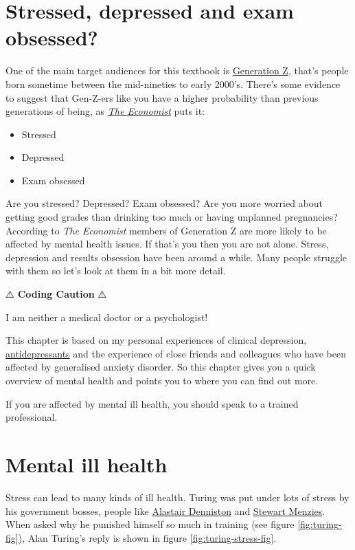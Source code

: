 \documentclass[
]{book}
\providecommand{\tightlist}{%
  \setlength{\itemsep}{0pt}\setlength{\parskip}{0pt}}
\begin{document}
\hypertarget{genz}{%
\section{Stressed, depressed and exam obsessed?}\label{genz}}

One of the main target audiences for this textbook is \href{https://en.wikipedia.org/wiki/Generation_Z}{Generation Z}, that's people born sometime between the mid-nineties to early 2000's. There's some evidence to suggest that Gen-Z-ers like you have a higher probability than previous generations of being, as \emph{\href{https://en.wikipedia.org/wiki/The_Economist}{The Economist}} puts it:

\begin{itemize}
\tightlist
\item
  Stressed
\item
  Depressed
\item
  Exam obsessed
\end{itemize}

Are you stressed? Depressed? Exam obsessed? Are you more worried about getting good grades than drinking too much or having unplanned pregnancies? According to \emph{The Economist} members of Generation Z are more likely to be affected by mental health issues. \citep{generationz} If that's you then you are not alone. Stress, depression and results obsession have been around a while. Many people struggle with them so let's look at them in a bit more detail.

⚠️ \textbf{Coding Caution} ⚠️

I am neither a medical doctor or a psychologist!

This chapter is based on my personal experiences of clinical depression, \href{https://en.wikipedia.org/wiki/Antidepressant}{antidepressants} and the experience of close friends and colleagues who have been affected by generalised anxiety disorder. So this chapter gives you a quick overview of mental health and points you to where you can find out more.

If you are affected by mental ill health, you should speak to a trained professional.

\hypertarget{illhealth}{%
\section{Mental ill health}\label{illhealth}}

Stress can lead to many kinds of ill health. Turing was put under lots of stress by his government bosses, people like \href{https://en.wikipedia.org/wiki/Alastair_Denniston}{Alastair Denniston} and \href{https://en.wikipedia.org/wiki/Stewart_Menzies}{Stewart Menzies}. \citep{imitationgame} When asked why he punished himself so much in training (see figure \ref{fig:turing-fig}), Alan Turing's reply is shown in figure \ref{fig:turing-stress-fig}.
\end{document}
